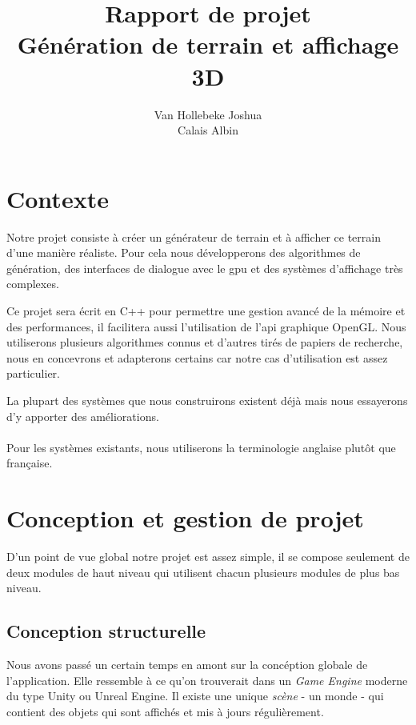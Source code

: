 \documentclass[11pt]{article} %
\title{Rapport de projet\\Génération de terrain et affichage 3D}
\author{Van Hollebeke Joshua\\Calais Albin}
\begin{document}
\maketitle

\section{Contexte}


Notre projet consiste à créer un générateur de terrain et à afficher ce terrain d'une manière réaliste. Pour cela nous développerons des algorithmes de génération, des interfaces de dialogue avec le gpu et des systèmes d'affichage très complexes.

Ce projet sera écrit en C++ pour permettre une gestion avancé de la mémoire et des performances, il facilitera aussi l'utilisation de l'api graphique OpenGL.
Nous utiliserons plusieurs algorithmes connus et d'autres tirés de papiers de recherche, nous en concevrons et adapterons certains car notre cas d'utilisation est assez particulier.

La plupart des systèmes que nous construirons existent déjà mais nous essayerons d'y apporter des améliorations.

\paragraph{}
Pour les systèmes existants, nous utiliserons la terminologie anglaise plutôt que française.

\section{Conception et gestion de projet}

D'un point de vue global notre projet est assez simple, il se compose seulement de deux modules de haut niveau qui utilisent chacun plusieurs modules de plus bas niveau.


\subsection{Conception structurelle}

Nous avons passé un certain temps en amont sur la concéption globale de l'application. Elle ressemble à ce qu'on trouverait dans un \textit{Game Engine} moderne du type Unity ou Unreal Engine. Il existe une unique \textit{scène} - un monde - qui contient des objets qui sont affichés et mis à jours régulièrement.
\end{document}

